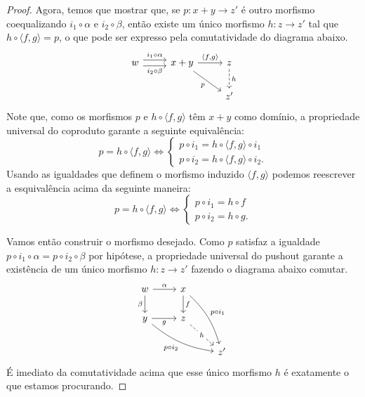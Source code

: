 \begin{proof}
    Agora, temos que mostrar que, se $p: x+y \to z'$ é outro morfismo coequalizando $i_1 \circ \alpha$ e $i_2 \circ \beta$, então existe um único morfismo $h: z \to z'$ tal que $h \circ \langle f,g  \rangle = p$, o que pode ser expresso pela comutatividade do diagrama abaixo.
    \begin{displaymath}
        \begin{tikzcd}
            w
            \arrow[r, shift left=1.25, "i_1 \circ \alpha"]
            \arrow[r, shift right=1.25, "i_2 \circ \beta" swap]
            & x+y
            \arrow[r, "{\langle f,g \rangle}"]
            \arrow[rd, "p" swap]
            & z
            \arrow[d, dashed, "h"]
            \\ & & z'
        \end{tikzcd}
    \end{displaymath}
    Note que, como os morfismos $p$ e $h \circ \langle f,g \rangle$ têm $x+y$ como domínio, a propriedade universal do coproduto garante a seguinte equivalência:
    \begin{displaymath}
        p = h \circ \langle f,g \rangle
        \iff
        \begin{cases}
            p \circ i_1 = h \circ \langle f,g \rangle \circ i_1 \\
            p \circ i_2 = h \circ \langle f,g \rangle \circ i_2.
        \end{cases}
    \end{displaymath}
    Usando as igualdades que definem o morfismo induzido $\langle f,g \rangle$ podemos reescrever a esquivalência acima  da seguinte maneira:
    \begin{displaymath}
        p = h \circ \langle f,g \rangle \iff
        \begin{cases}
            p \circ i_1 = h \circ f \\
            p \circ i_2 = h \circ g.
        \end{cases}
    \end{displaymath}
    
    Vamos então construir o morfismo desejado.
    Como $p$ satisfaz a igualdade $p \circ i_1 \circ \alpha = p \circ i_2 \circ \beta$ por hipótese, a propriedade universal do pushout garante a existência de um único morfismo $h: z \to z'$ fazendo o diagrama abaixo comutar.
    \begin{displaymath}
        \begin{tikzcd}
            w
            \arrow[r, "\alpha"]
            \arrow[d, "\beta" swap]
            & x
            \arrow[d, "f"]
            \arrow[rdd, bend left=15, "p \circ i_1"]
            \\ y
            \arrow[r, "g" swap]
            \arrow[rrd, bend right=15, "p \circ i_2" swap]
            & z
            \arrow[rd, dashed, "h" description]
            \\ & & z'
        \end{tikzcd}
    \end{displaymath}
    É imediato da comutatividade acima que esse único morfismo $h$ é exatamente o que estamos procurando.


\end{proof}
